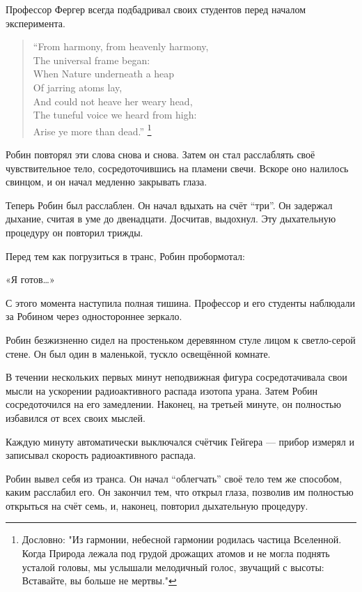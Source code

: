 \documentclass[a5paper, 9pt,
final, openany, twoside=true]{memoir}
\begin{document}
Профессор Фергер всегда подбадривал своих студентов перед началом эксперимента.
\begin{quote}
``From harmony, from heavenly harmony,\\
The universal frame began:\\
When Nature underneath a heap\\
Of jarring atoms lay,\\
And could not heave her weary head,\\
The tuneful voice we heard from high:\\
Arise ye more than dead.'' \footnote[1]{Дословно: "Из гармонии, небесной гармонии родилась частица Вселенной. Когда Природа лежала под грудой дрожащих атомов и не могла поднять усталой головы, мы услышали мелодичный голос, звучащий с высоты: Вставайте, вы больше не мертвы."}
\end{quote}

Робин повторял эти слова снова и снова. Затем он стал расслаблять своё чувствительное тело, сосредоточившись на пламени свечи. Вскоре оно налилось свинцом, и он начал медленно закрывать глаза.

Теперь Робин был расслаблен.  Он начал вдыхать на счёт ``три''. Он задержал дыхание, считая в уме до двенадцати. Досчитав, выдохнул. Эту дыхательную процедуру он повторил трижды.

Перед тем как погрузиться в транс, Робин пробормотал:

«Я готов…»\bigskip

С этого момента наступила полная тишина. Профессор и его студенты наблюдали за Робином через одностороннее зеркало.\bigskip

Робин безжизненно сидел на простеньком деревянном стуле лицом к светло-серой стене. Он был один в маленькой, тускло освещённой комнате.

В течении нескольких первых минут неподвижная фигура сосредотачивала свои мысли на ускорении радиоактивного распада изотопа урана. Затем Робин сосредоточился на его замедлении. Наконец, на третьей минуте, он полностью избавился от всех своих мыслей.

Каждую минуту автоматически выключался счётчик Гейгера — прибор измерял и записывал скорость радиоактивного распада.\bigskip

Робин вывел себя из транса. Он начал ``облегчать'' своё тело тем же способом, каким расслабил его. Он закончил тем, что открыл глаза, позволив им полностью открыться на счёт семь, и, наконец, повторил дыхательную процедуру.
\end{document}
